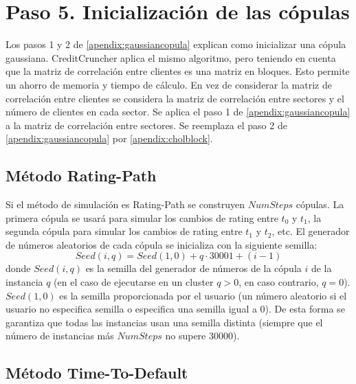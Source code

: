 \section{Paso 5. Inicializaci\'on de las c\'opulas}

Los pasos 1 y 2 de \ref{apendix:gaussiancopula} explican como
inicializar una c\'opula gaussiana. CreditCruncher aplica el 
mismo algoritmo, pero teniendo en cuenta que la matriz de
correlaci\'on entre clientes es una matriz en bloques. Esto
permite un ahorro de memoria y tiempo de c\'alculo. En vez de
considerar la matriz de correlaci\'on entre clientes se
considera la matriz de correlaci\'on entre sectores y el
n\'umero de clientes en cada sector. Se aplica el paso 1
de \ref{apendix:gaussiancopula} a la matriz de correlaci\'on
entre sectores. Se reemplaza el paso 2 de \ref{apendix:gaussiancopula}
por \ref{apendix:cholblock}.


\subsection{M\'etodo Rating-Path}

Si el m\'etodo de simulaci\'on es Rating-Path se construyen
$NumSteps$ c\'opulas. La primera c\'opula se usar\'a para simular
los cambios de rating entre $t_0$ y $t_1$, la segunda c\'opula
para simular los cambios de rating entre $t_1$ y $t_2$, etc.
\newline
\newline
El generador de n\'umeros aleatorios de cada c\'opula se
inicializa con la siguiente semilla:
\begin{displaymath}
Seed(i,q) = Seed(1,0) + q \cdot 30001 + (i-1)
\end{displaymath}
donde $Seed(i,q)$ es la semilla del generador de n\'umeros de la
c\'opula $i$ de la instancia $q$ (en el caso de ejecutarse en un
cluster $q>0$, en caso contrario, $q=0$). $Seed(1,0)$ es la semilla
proporcionada por el usuario (un n\'umero aleatorio si el usuario no
especifica semilla o especifica una semilla igual a 0). De esta
forma se garantiza que todas las instancias usan una semilla distinta
(siempre que el n\'umero de instancias m\'as $NumSteps$ no supere 30000).

\subsection{M\'etodo Time-To-Default}

